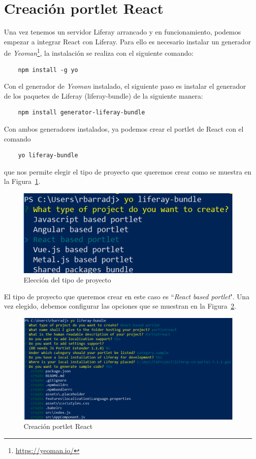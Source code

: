 \documentclass[a4paper, 12pt]{book}
\begin{document}
\section{Creación portlet React}
\label{sec:creacion-portlet-react}
Una vez tenemos un servidor Liferay arrancado y en funcionamiento, podemos empezar a integrar React con Liferay. Para ello es necesario instalar un generador de \textit{Yeoman}\footnote{\url{https://yeoman.io/}}, la instalación se realiza con el siguiente comando: 
\begin{verbatim}
    npm install -g yo
\end{verbatim}

Con el generador de \textit{Yeoman} instalado, el siguiente paso es instalar el generador de los paquetes de Liferay (liferay-bundle) de la siguiente manera:
\begin{verbatim}
    npm install generator-liferay-bundle
\end{verbatim}

Con ambos generadores instalados, ya podemos crear el portlet de React con el comando 
\begin{verbatim}
    yo liferay-bundle
\end{verbatim} 
que nos permite elegir el tipo de proyecto que queremos crear como se muestra en la Figura~\ref{fig:liferay_type}.
\begin{figure}[h]
  \centering
  \includegraphics{img_usadas/liferay-bundle-react.png}
  \caption{Elección del tipo de proyecto}
  \label{fig:liferay_type}
\end{figure}

El tipo de proyecto que queremos crear en este caso es ``\textit{React based portlet}". Una vez elegido, debemos configurar las opciones que se muestran en la Figura~\ref{fig:liferay_generator_portlet}.
\begin{figure}[t]
  \centering
  \includegraphics{img_usadas/liferay-bundle-generator.png}
  \caption{Creación portlet React}
  \label{fig:liferay_generator_portlet}
\end{figure}
\end{document}
